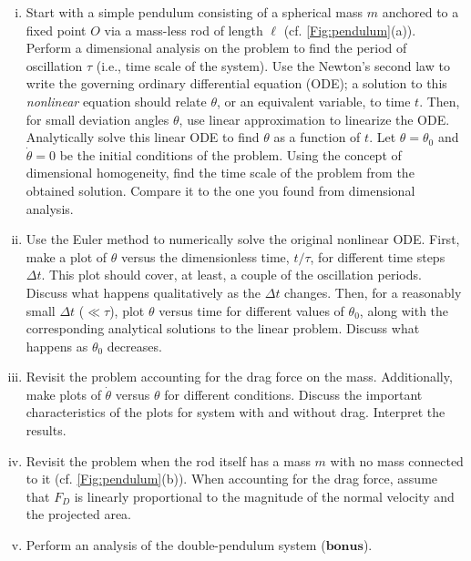 \documentclass[letterpaper]{article}
\begin{document}
\begin{enumerate}[(i)]
\item Start with a simple pendulum consisting of a spherical mass $m$ anchored to a fixed point $O$ via a mass-less rod of length $\ell$ (cf. \autoref{Fig:pendulum}(a)). Perform a dimensional analysis on the problem to find the period of oscillation $\tau$ (i.e., time scale of the system). Use the Newton's second law to write the governing ordinary differential equation (ODE); a solution to this \emph{nonlinear} equation should relate $\theta$, or an equivalent variable, to time $t$. Then, for small deviation angles $\theta$, use linear approximation to linearize the ODE. Analytically solve this linear ODE to find $\theta$ as a function of $t$. Let $\theta=\theta_0$ and $\dot{\theta}=0$ be the initial conditions of the problem. Using the concept of dimensional homogeneity, find the time scale of the problem from the obtained solution. Compare it to the one you found from dimensional analysis.

\item Use the Euler method to numerically solve the original nonlinear ODE. First, make a plot of $\theta$ versus the dimensionless time, $t/\tau$, for different time steps $\Delta t$. This plot should cover, at least, a couple of the oscillation periods. Discuss what happens qualitatively as the $\Delta t$ changes. Then, for a reasonably small $\Delta t$ ($\ll\tau$), plot $\theta$ versus time for different values of $\theta_0$, along with the corresponding analytical solutions to the linear problem. Discuss what happens as $\theta_0$ decreases.

\item Revisit the problem accounting for the drag force on the mass. Additionally, make plots of $\dot{\theta}$ versus $\theta$ for different conditions. Discuss the important characteristics of the plots for system with and without drag. Interpret the results.

\item Revisit the problem when the rod itself has a mass $m$ with no mass connected to it (cf. \autoref{Fig:pendulum}(b)). When accounting for the drag force, assume that $F_D$ is linearly proportional to the magnitude of the normal velocity and the projected area. 

\item Perform an analysis of the double-pendulum system ($\textbf{bonus}$). 
  
\end{enumerate}
\end{document}
